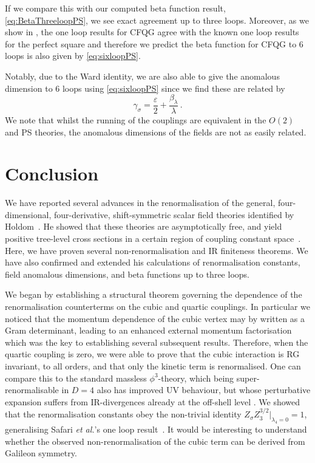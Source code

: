 \documentclass[a4paper,11pt]{article}
\begin{document}
If we compare this with our computed beta function result, \cref{eq:BetaThreeloopPS}, we see exact agreement up to three loops. Moreover, as we show in \cite{Anderson:2026Rsqaured}, the one loop results for CFQG agree with the known one loop results for the perfect square and therefore we predict the beta function for CFQG to 6 loops is also given by \cref{eq:sixloopPS}. 

Notably, due to the Ward identity, we are also able to give the anomalous dimension to 6 loops using \cref{eq:sixloopPS} since we find these are related by 
\begin{equation}
    \gamma_\sigma = \frac{\varepsilon}{2} +\frac{\beta_\lambda}{\lambda} \,.
\end{equation}
We note that whilst the running of the couplings are equivalent in the $O(2)$ and PS theories, the anomalous dimensions of the fields are not as easily related.


\section{Conclusion }
\label{sec:Conclusion}

We have reported several advances in the renormalisation of the general, four-dimensional, four-derivative, shift-symmetric scalar field theories identified by Holdom~\cite{Holdom:2023usn}. He showed that these theories are asymptotically free, and yield positive tree-level cross sections in a certain region of coupling constant space~\cite{Holdom:2024cfq}. Here, we have proven several non-renormalisation and IR finiteness theorems. We have also confirmed and extended his calculations of renormalisation constants, field anomalous dimensions, and beta functions up to three loops. 

We began by establishing a structural theorem governing the dependence of the renormalisation counterterms on the cubic and quartic couplings. In particular we noticed that the momentum dependence of the cubic vertex may by written as a Gram determinant, leading to an enhanced external momentum factorisation which was the key to establishing several subsequent results. Therefore, when the quartic coupling is zero, we were able to prove that the cubic interaction is RG invariant, to all orders, and that only the kinetic term is renormalised. One can compare this to the standard massless $\phi^3$-theory, which being super-renormalisable in $D=4$ also has improved UV behaviour, but whose perturbative expansion suffers from IR-divergences already at the off-shell level \cite{Jackiw:1980kv,Larin:2002sc}. We showed that the renormalisation constants obey the non-trivial identity $Z_\sigma Z_3^{3/2}\big|_{\lambda_4 = 0} = 1$, generalising Safari {\it et al.}'s one loop result~\cite{Safari:2021ocb}. It would be interesting to understand whether the observed non-renormalisation of the cubic term can be derived from Galileon symmetry. 
\end{document}
